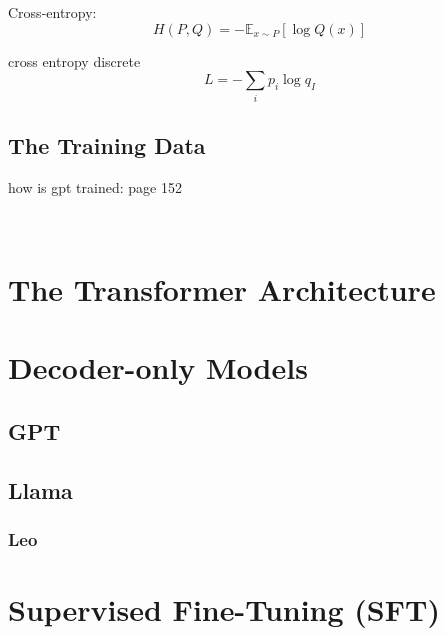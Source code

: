 Cross-entropy:
\[
    H(P, Q) = - \mathbb{E}_{x \sim P} [\log Q(x)]
\]

cross entropy discrete
\[
    L = - \sum_i p_i \log q_I
\]


\subsection{The Training Data}\label{subsec:the-training-data}
how is gpt trained: page 152
~\autocite{transformer2022}

~\autocite{transformer2024}


\section{The Transformer Architecture}\label{sec:the-transformer-architecture}









\section{Decoder-only Models}\label{sec:decoder}

\subsection{GPT}\label{subsec:gpt}

\subsection{Llama}\label{subsec:llama}

\subsubsection{Leo}


\section{Supervised Fine-Tuning (SFT)}\label{sec:supervised-fine-tuning}


